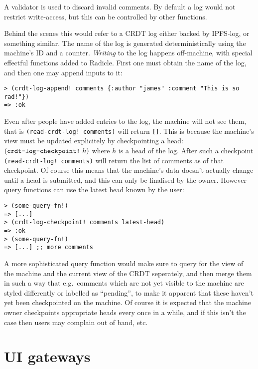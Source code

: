 \documentclass[a4paper, oneside, 10pt]{amsart}
\begin{document}
A validator is used to discard invalid comments. By default a log would not
restrict write-access, but this can be controlled by other functions.

Behind the scenes this would refer to a CRDT log either backed by IPFS-log, or
something similar. The name of the log is generated deterministically using the
machine's ID and a counter. \emph{Writing} to the log happens off-machine, with
special effectful functions added to Radicle. First one must obtain the name of
the log, and then one may append inputs to it:

\begin{Verbatim}[fontsize=\small]
> (crdt-log-append! comments {:author "james" :comment "This is so rad!"})
=> :ok
\end{Verbatim}

Even after people have added entries to the log, the machine will not see them,
that is \texttt{(read-crdt-log! comments)} will return \texttt{[]}. This is
because the machine's view must be updated explicitely by checkpointing a head:
$(\text{\texttt{crdt-log-checkpoint!}} \ h)$ where $h$ is a head of the
log. After such a checkpoint \texttt{(read-crdt-log! comments)} will return the
list of comments as of that checkpoint. Of course this means that the machine's
data doesn't actually change until a head is submitted, and this can only be
finalised by the owner. However query functions can use the latest head known by
the user:

\begin{Verbatim}[fontsize=\small]
> (some-query-fn!)
=> [...]
> (crdt-log-checkpoint! comments latest-head)
=> :ok
> (some-query-fn!)
=> [...] ;; more comments
\end{Verbatim}

A more sophisticated query function would make sure to query for the view of the
machine and the current view of the CRDT seperately, and then merge them in such
a way that e.g.~comments which are not yet visible to the machine are styled
differently or labelled as ``pending'', to make it apparent that these haven't
yet been checkpointed on the machine. Of course it is expected that the machine
owner checkpoints appropriate heads every once in a while, and if this isn't the
case then users may complain out of band, etc.

\section{UI gateways}
\end{document}
